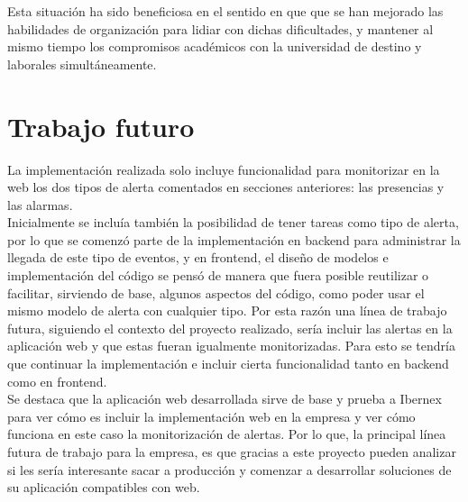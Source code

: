 Esta situación ha sido beneficiosa en el sentido en que que se han mejorado las habilidades de organización para lidiar con dichas dificultades, y mantener al mismo tiempo los compromisos académicos con la universidad de destino y laborales simultáneamente.


\section{Trabajo futuro}
\label{section-trabajo-futuro}

La implementación realizada solo incluye funcionalidad para monitorizar en la web los dos tipos de alerta comentados en secciones anteriores: las presencias y las alarmas.\\

Inicialmente se incluía también la posibilidad de tener tareas como tipo de alerta, por lo que se comenzó parte de la implementación en backend para administrar la llegada de este tipo de eventos, y en frontend, el diseño de modelos e implementación del código se pensó de manera que fuera posible reutilizar o facilitar, sirviendo de base, algunos aspectos del código, como poder usar el mismo modelo de alerta con cualquier tipo.
Por esta razón una línea de trabajo futura, siguiendo el contexto del proyecto realizado, sería incluir las alertas en la aplicación web y que estas fueran igualmente monitorizadas. Para esto se tendría que continuar la implementación e incluir cierta funcionalidad tanto en backend como en frontend.\\

Se destaca que la aplicación web desarrollada sirve de base y prueba a Ibernex para ver cómo es incluir la implementación web en la empresa y ver cómo funciona en este caso la monitorización de alertas. Por lo que, la principal línea futura de trabajo para la empresa, es que gracias a este proyecto pueden analizar si les sería interesante sacar a producción y comenzar a desarrollar soluciones de su aplicación compatibles con web.